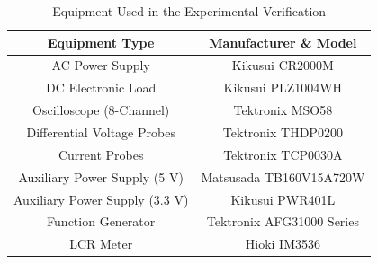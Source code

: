 \documentclass[lettersize,journal]{IEEEtran}
\begin{document}
\begin{table}[b!] %
    \caption{Equipment Used in the Experimental Verification}
    \centering
    \footnotesize
    \setlength{\tabcolsep}{3pt}
    \begin{tabular}{cc}
        \hline
        \textbf{Equipment Type} & \textbf{Manufacturer \& Model} \\
        \hline \hline
        AC Power Supply & Kikusui CR2000M \\
        DC Electronic Load & Kikusui PLZ1004WH \\
        Oscilloscope (8-Channel) & Tektronix MSO58 \\
        Differential Voltage Probes & Tektronix THDP0200 \\
        Current Probes & Tektronix TCP0030A \\
        Auxiliary Power Supply (5 V) & Matsusada TB160V15A720W \\
        Auxiliary Power Supply (3.3 V) & Kikusui PWR401L \\
        Function Generator & Tektronix AFG31000 Series \\
        LCR Meter & Hioki IM3536 \\
        \hline
    \end{tabular}
    \label{tab:equipment}
\end{table}
\end{document}
